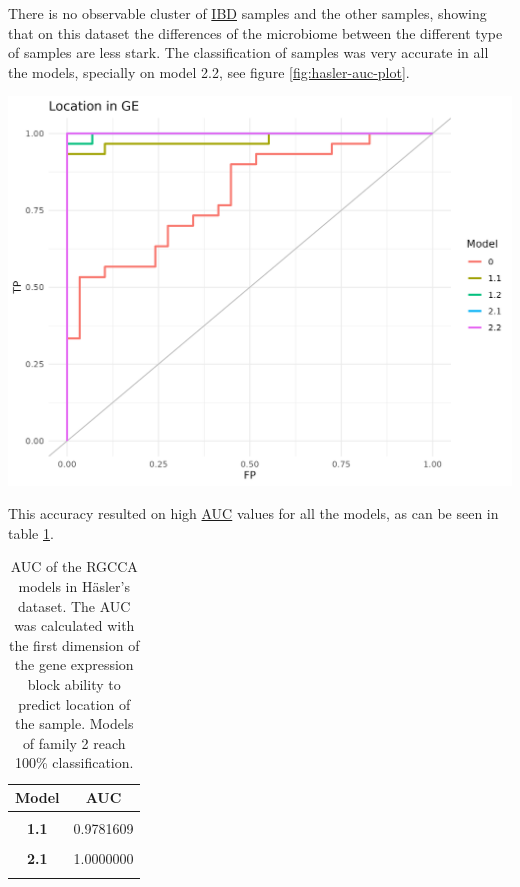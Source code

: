 \documentclass[
  12pt,
  a4paper,
  twoside,
  openright]{book}
\let\origfigure\figure
\let\endorigfigure\endfigure
\renewenvironment{figure}[1][2] {
    \expandafter\origfigure\expandafter[!htbp]
} {
    \endorigfigure
}
\begin{document}
There is no observable cluster of \protect\hyperlink{acronyms_IBD}{IBD} samples and the other samples, showing that on this dataset the differences of the microbiome between the different type of samples are less stark.
The classification of samples was very accurate in all the models, specially on model 2.2, see figure \ref{fig:hasler-auc-plot}.

\begin{figure}
\includegraphics[width=1\linewidth]{images/hasler-auc} \caption[AUC of the RGCCA models in the Häsler dataset]{AUC of the RGCCA models in the Häsler dataset. The classification of the localization of the sample according to the first component of the gene expression of the models generated with RGCCA on the Häsler's dataset.}\label{fig:hasler-auc-plot}
\end{figure}

This accuracy resulted on high \protect\hyperlink{acronyms_AUC}{AUC} values for all the models, as can be seen in table \ref{tab:hasler-auc}.




\begin{table}[H]

\caption[AUC of the RGCCA models in Häsler's dataset. ]{\label{tab:hasler-auc}AUC of the RGCCA models in Häsler's dataset. The AUC was calculated with the first dimension of the gene expression block ability to predict location of the sample. Models of family 2 reach 100\% classification.}
\centering
\begin{tabular}[t]{>{}c|c}
\hline
\textbf{Model} & \textbf{AUC}\\
\hline
\textbf{\cellcolor{gray!6}{0}} & \cellcolor{gray!6}{0.8011494}\\
\hline
\textbf{1.1} & 0.9781609\\
\hline
\textbf{\cellcolor{gray!6}{1.2}} & \cellcolor{gray!6}{0.9977011}\\
\hline
\textbf{2.1} & 1.0000000\\
\hline
\textbf{\cellcolor{gray!6}{2.2}} & \cellcolor{gray!6}{1.0000000}\\
\hline
\end{tabular}
\end{table}
\end{document}
